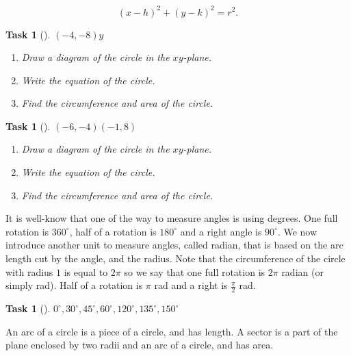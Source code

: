 \documentclass[10pt,]{article}
\theoremstyle{plain}
\newtheorem{proposition}[theorem]{Task}
\theoremstyle{definition}
\numberwithin{equation}{section}
\begin{document}
\begin{equation*}
(x-h)^2+(y-k)^2=r^2.
\end{equation*}
%
\begin{proposition}[{}]\label{proposition-47}
\((-4,-8)\)\(y\)\leavevmode%
\begin{enumerate}
\item\hypertarget{li-245}{}Draw a diagram of the circle in the \(xy\)-plane.%
\item\hypertarget{li-246}{}Write the equation of the circle.%
\item\hypertarget{li-247}{}Find the circumference and area of the circle.%
\end{enumerate}
\end{proposition}
\begin{proposition}[{}]\label{proposition-48}
\((-6,-4)\)\((-1,8)\)\leavevmode%
\begin{enumerate}
\item\hypertarget{li-248}{}Draw a diagram of the circle in the \(xy\)-plane.%
\item\hypertarget{li-249}{}Write the equation of the circle.%
\item\hypertarget{li-250}{}Find the circumference and area of the circle.%
\end{enumerate}
\end{proposition}
\hypertarget{p-115}{}%
It is well-know that one of the way to measure angles is using degrees. One full rotation is \(360^{\circ}\), half of a rotation is \(180^{\circ}\) and a right angle is \(90^{\circ}\). We now introduce another unit to measure angles, called radian, that is based on the arc length cut by the angle, and the radius. Note that the circumference of the circle with radius \(1\) is equal to \(2\pi\) so we say that one full rotation is \(2\pi\) radian (or simply rad). Half of a rotation is \(\pi\) rad and a right is \(\frac{\pi}{2}\) rad.%
\begin{proposition}[{}]\label{proposition-49}
\(0^{\circ}, 30^{\circ}, 45^{\circ}, 60^{\circ}, 120^{\circ}, 135^{\circ}, 150^{\circ}\)\end{proposition}
\hypertarget{p-116}{}%
An arc of a circle is a piece of a circle, and has length. A sector is a part of the plane enclosed by two radii and an arc of a circle, and has area.%
\end{document}
